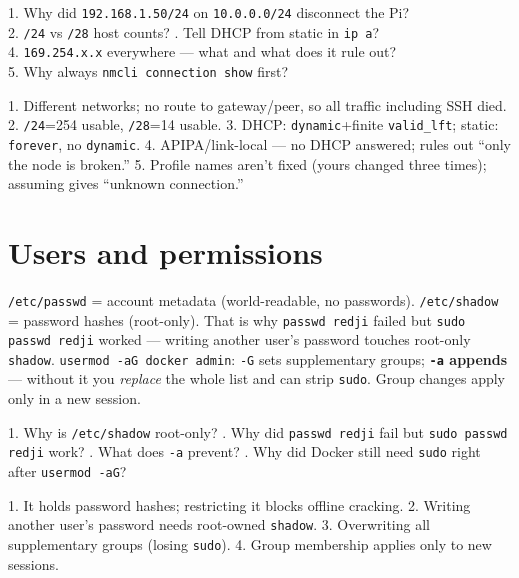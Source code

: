 \documentclass[11pt,a4paper]{article}
\begin{document}
\begin{skillq}
1. Why did \texttt{192.168.1.50/24} on \texttt{10.0.0.0/24} disconnect the Pi?\\
2. \texttt{/24} vs \texttt{/28} host counts? . Tell DHCP from static in \texttt{ip a}?\\
4. \texttt{169.254.x.x} everywhere — what and what does it rule out?\\
5. Why always \texttt{nmcli connection show} first?
\end{skillq}
\begin{skilla}
1. Different networks; no route to gateway/peer, so all traffic including SSH died.
2. \texttt{/24}=254 usable, \texttt{/28}=14 usable.
3. DHCP: \texttt{dynamic}+finite \texttt{valid\_lft}; static: \texttt{forever}, no \texttt{dynamic}.
4. APIPA/link-local — no DHCP answered; rules out ``only the node is broken.''
5. Profile names aren't fixed (yours changed three times); assuming gives ``unknown connection.''
\end{skilla}

\section{Users and permissions}
\texttt{/etc/passwd} = account metadata (world-readable, no passwords).
\texttt{/etc/shadow} = password hashes (root-only). That is why
\texttt{passwd redji} failed but \texttt{sudo passwd redji} worked — writing
another user's password touches root-only \texttt{shadow}. \texttt{usermod
-aG docker admin}: \texttt{-G} sets supplementary groups; \textbf{\texttt{-a}
appends} — without it you \emph{replace} the whole list and can strip
\texttt{sudo}. Group changes apply only in a new session.

\begin{skillq}
1. Why is \texttt{/etc/shadow} root-only? . Why did \texttt{passwd redji} fail but \texttt{sudo passwd redji} work? . What does \texttt{-a} prevent? . Why did Docker still need \texttt{sudo} right after \texttt{usermod -aG}?
\end{skillq}
\begin{skilla}
1. It holds password hashes; restricting it blocks offline cracking. 2. Writing another user's password needs root-owned \texttt{shadow}. 3. Overwriting all supplementary groups (losing \texttt{sudo}). 4. Group membership applies only to new sessions.
\end{skilla}
\end{document}
